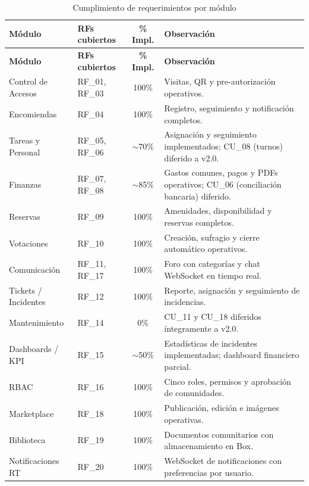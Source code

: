 \begin{longtable}{|p{}|p{}|c|p{}|}
\caption{Cumplimiento de requerimientos por módulo}\label{tab:cumplimiento}\\
\hline
\textbf{Módulo} & \textbf{RFs cubiertos} & \textbf{\% Impl.} & \textbf{Observación} \\
\hline
\endfirsthead
\hline
\textbf{Módulo} & \textbf{RFs cubiertos} & \textbf{\% Impl.} & \textbf{Observación} \\
\hline
\endhead
\hline
\endfoot

Control de Accesos & RF\_01, RF\_03 & 100\% & Visitas, QR y pre-autorización operativos. \\
\hline
Encomiendas & RF\_04 & 100\% & Registro, seguimiento y notificación completos. \\
\hline
Tareas y Personal & RF\_05, RF\_06 & $\sim$70\% & Asignación y seguimiento implementados; CU\_08 (turnos) diferido a v2.0. \\
\hline
Finanzas & RF\_07, RF\_08 & $\sim$85\% & Gastos comunes, pagos y PDFs operativos; CU\_06 (conciliación bancaria) diferido. \\
\hline
Reservas & RF\_09 & 100\% & Amenidades, disponibilidad y reservas completos. \\
\hline
Votaciones & RF\_10 & 100\% & Creación, sufragio y cierre automático operativos. \\
\hline
Comunicación & RF\_11, RF\_17 & 100\% & Foro con categorías y chat WebSocket en tiempo real. \\
\hline
Tickets / Incidentes & RF\_12 & 100\% & Reporte, asignación y seguimiento de incidencias. \\
\hline
Mantenimiento & RF\_14 & 0\% & CU\_11 y CU\_18 diferidos íntegramente a v2.0. \\
\hline
Dashboards / KPI & RF\_15 & $\sim$50\% & Estadísticas de incidentes implementadas; dashboard financiero parcial. \\
\hline
RBAC & RF\_16 & 100\% & Cinco roles, permisos y aprobación de comunidades. \\
\hline
Marketplace & RF\_18 & 100\% & Publicación, edición e imágenes operativas. \\
\hline
Biblioteca & RF\_19 & 100\% & Documentos comunitarios con almacenamiento en Box. \\
\hline
Notificaciones RT & RF\_20 & 100\% & WebSocket de notificaciones con preferencias por usuario. \\

\end{longtable}

